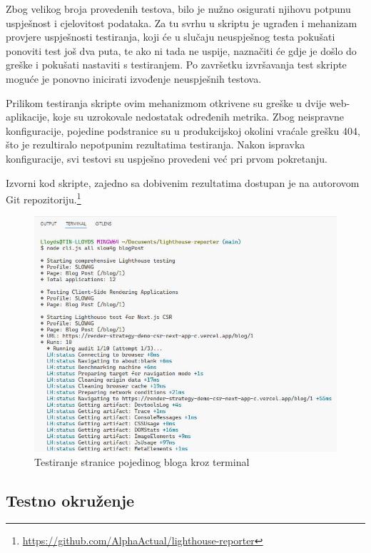 \bigskip

Zbog velikog broja provedenih testova, bilo je nužno osigurati njihovu potpunu uspješnost i cjelovitost podataka. Za tu svrhu u skriptu je ugrađen i mehanizam provjere uspješnosti testiranja, koji će u slučaju neuspješnog testa pokušati ponoviti test još dva puta, te ako ni tada ne uspije, naznačiti će gdje je došlo do greške i pokušati nastaviti s testiranjem. Po završetku izvršavanja test skripte moguće je ponovno inicirati izvođenje neuspješnih testova.

\bigskip

Prilikom testiranja skripte ovim mehanizmom otkrivene su greške u dvije web-aplikacije, koje su uzrokovale nedostatak određenih metrika. Zbog neispravne konfiguracije, pojedine podstranice su u produkcijskoj okolini vraćale grešku 404, što je rezultiralo nepotpunim rezultatima testiranja. Nakon ispravka konfiguracije, svi testovi su uspješno provedeni već pri prvom pokretanju.

\bigskip

Izvorni kod skripte, zajedno sa dobivenim rezultatima dostupan je na autorovom Git repozitoriju.\footnote{\url{https://github.com/AlphaActual/lighthouse-reporter}}

\begin{figure}[H]
    \centering
    \includegraphics[width=\textwidth]{slike/metodologija/testiranje-aplikacije.jpg}
    \caption{Testiranje stranice pojedinog bloga kroz terminal}
    \label{fig:testiranje-aplikacije}
\end{figure}

\subsection{Testno okruženje}

